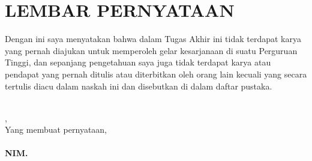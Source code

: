 %
%
%
%


\chapter*{LEMBAR PERNYATAAN}

Dengan ini saya menyatakan bahwa dalam Tugas Akhir ini tidak terdapat karya yang pernah diajukan untuk memperoleh gelar kesarjanaan di suatu Perguruan Tinggi, dan sepanjang pengetahuan saya juga tidak terdapat karya atau pendapat yang pernah ditulis atau diterbitkan oleh orang lain kecuali yang secara tertulis diacu dalam naskah ini dan disebutkan di dalam daftar pustaka.\\
\vspace{1cm}\\

\begin{flushright}
	\kota, \tanggalSidang\\
	Yang membuat pernyataan,\\
	\vspace{2cm}
	\textbf{\underline{\penulis}\\
		\vspace{-0.15cm}
		NIM. \nim}

\end{flushright}

